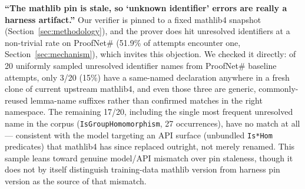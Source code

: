 \documentclass{article}
\begin{document}
\textbf{``The mathlib pin is stale, so `unknown identifier' errors are really a harness artifact.''}
Our verifier is pinned to a fixed mathlib4 snapshot (Section~\ref{sec:methodology}), and the prover
does hit unresolved identifiers at a non-trivial rate on ProofNet\# (51.9\% of attempts encounter one,
Section~\ref{sec:mechanism}), which invites this objection. We checked it directly: of 20 uniformly
sampled unresolved identifier names from ProofNet\# baseline attempts, only 3/20 (15\%) have a
same-named declaration anywhere in a fresh clone of current upstream mathlib4, and even those three
are generic, commonly-reused lemma-name suffixes rather than confirmed matches in the right namespace.
The remaining 17/20, including the single most frequent unresolved name in the corpus
(\texttt{IsGroupHomomorphism}, 27 occurrences), have no match at all --- consistent with the model
targeting an API surface (unbundled \texttt{Is*Hom} predicates) that mathlib4 has since replaced
outright, not merely renamed. This sample leans toward genuine model/API mismatch over pin staleness,
though it does not by itself distinguish training-data mathlib version from harness pin version as the
source of that mismatch.
\end{document}
